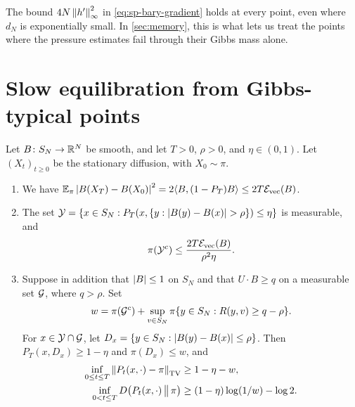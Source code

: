 The bound $4N\left\lVert h'\right\rVert_\infty^2$ in \eqref{eq:sp-bary-gradient} holds at every point, even where $d_N$ is exponentially small. In \cref{sec:memory}, this is what lets us treat the points where the pressure estimates fail through their Gibbs mass alone.

\section{Slow equilibration from Gibbs-typical points}\label{sec:sp-trap}

\begin{lemma}\label{lem:sp-trap}
Let $B\colon S_N\to\mathbb R^N$ be smooth, and let $T>0$, $\rho>0$, and $\eta\in(0,1)$. Let $(X_t)_{t\ge0}$ be the stationary diffusion, with $X_0\sim\pi$.
\begin{enumerate}
\item We have $\mathbb E_\pi\left|B(X_T)-B(X_0)\right|^2=2\langle B,(1-P_T)B\rangle\le2T\mathcal E_{\rm vec}(B)$.
\item The set $\mathcal Y=\{x\in S_N:P_T(x,\{y:\abs{B(y)-B(x)}>\rho\})\le\eta\}$ is measurable, and
\[
\pi(\mathcal Y^c)\le\frac{2T\mathcal E_{\rm vec}(B)}{\rho^2\eta}.
\]
\item Suppose in addition that $\left|B\right|\le1$ on $S_N$ and that $U\cdot B\ge q$ on a measurable set $\mathcal G$, where $q>\rho$. Set
\[
w=\pi(\mathcal G^c)+\sup_{v\in S_N}\pi\{y\in S_N:R(y,v)\ge q-\rho\}.
\]
For $x\in\mathcal Y\cap\mathcal G$, let $D_x=\{y\in S_N:\left|B(y)-B(x)\right|\le\rho\}$. Then $P_T(x,D_x)\ge1-\eta$ and $\pi(D_x)\le w$, and
\begin{align}
\inf_{0\le t\le T}\left\lVert P_t(x,\cdot)-\pi\right\rVert_{\mathrm{TV}}&\ge1-\eta-w,\label{eq:sp-trap-tv}\\
\inf_{0<t\le T}D\big(P_t(x,\cdot)\,\big\|\,\pi\big)&\ge(1-\eta)\log(1/w)-\log2.\label{eq:sp-trap-ent}
\end{align}
\end{enumerate}
\end{lemma}

